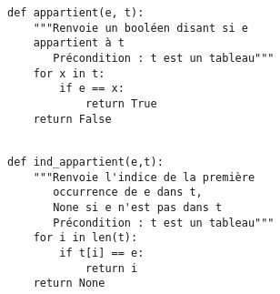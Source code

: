 \exer{}
\setcounter{numques}{0}


\begin{lstlisting}
def appartient(e, t):
    """Renvoie un booléen disant si e 
    appartient à t
       Précondition : t est un tableau"""
    for x in t:
        if e == x:
            return True 
    return False
 
\end{lstlisting}


\begin{lstlisting}
def ind_appartient(e,t):
    """Renvoie l'indice de la première 
       occurrence de e dans t,
       None si e n'est pas dans t
       Précondition : t est un tableau"""
    for i in len(t):
        if t[i] == e:
            return i 
    return None
\end{lstlisting}